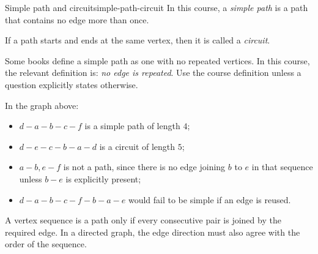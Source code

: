 \begin{definition}{Simple path and circuit}{simple-path-circuit}
In this course, a \emph{simple path} is a path that contains no edge more than once.

If a path starts and ends at the same vertex, then it is called a \emph{circuit}.
\end{definition}

\begin{examtip}[title={Course convention for simple path}]
Some books define a simple path as one with no repeated vertices. In this course, the relevant definition is: \emph{no edge is repeated}. Use the course definition unless a question explicitly states otherwise.
\end{examtip}

\begin{center}
\end{center}

\begin{examplebox}[title={Reading paths from a graph}]
In the graph above:
\begin{itemize}[leftmargin=*]
    \item \(d-a-b-c-f\) is a simple path of length \(4\);
    \item \(d-e-c-b-a-d\) is a circuit of length \(5\);
    \item \(a-b,e-f\) is not a path, since there is no edge joining \(b\) to \(e\) in that sequence unless \(b-e\) is explicitly present;
    \item \(d-a-b-c-f-b-a-e\) would fail to be simple if an edge is reused.
\end{itemize}
\end{examplebox}

\begin{commonmistake}[title={A sequence of vertices is not automatically a path}]
A vertex sequence is a path only if every consecutive pair is joined by the required edge. In a directed graph, the edge direction must also agree with the order of the sequence.
\end{commonmistake}


